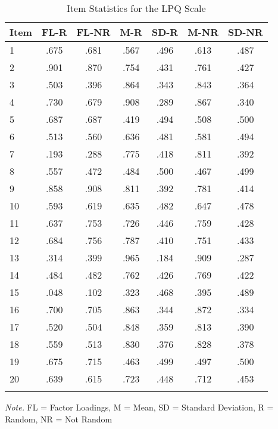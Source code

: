 \documentclass[english,man, mask]{apa6}
\theoremstyle{definition}
\theoremstyle{definition}
\theoremstyle{definition}
\theoremstyle{remark}
\begin{document}
\begin{table}[tbp]
\begin{center}
\begin{threeparttable}
\caption{\label{tab:Ltable}Item Statistics for the LPQ Scale}
\begin{tabular}{lcccccc}
\toprule
Item & \multicolumn{1}{c}{FL-R} & \multicolumn{1}{c}{FL-NR} & \multicolumn{1}{c}{M-R} & \multicolumn{1}{c}{SD-R} & \multicolumn{1}{c}{M-NR} & \multicolumn{1}{c}{SD-NR}\\
\midrule
1 & .675 & .681 & .567 & .496 & .613 & .487\\
2 & .901 & .870 & .754 & .431 & .761 & .427\\
3 & .503 & .396 & .864 & .343 & .843 & .364\\
4 & .730 & .679 & .908 & .289 & .867 & .340\\
5 & .687 & .687 & .419 & .494 & .508 & .500\\
6 & .513 & .560 & .636 & .481 & .581 & .494\\
7 & .193 & .288 & .775 & .418 & .811 & .392\\
8 & .557 & .472 & .484 & .500 & .467 & .499\\
9 & .858 & .908 & .811 & .392 & .781 & .414\\
10 & .593 & .619 & .635 & .482 & .647 & .478\\
11 & .637 & .753 & .726 & .446 & .759 & .428\\
12 & .684 & .756 & .787 & .410 & .751 & .433\\
13 & .314 & .399 & .965 & .184 & .909 & .287\\
14 & .484 & .482 & .762 & .426 & .769 & .422\\
15 & .048 & .102 & .323 & .468 & .395 & .489\\
16 & .700 & .705 & .863 & .344 & .872 & .334\\
17 & .520 & .504 & .848 & .359 & .813 & .390\\
18 & .559 & .513 & .830 & .376 & .828 & .378\\
19 & .675 & .715 & .463 & .499 & .497 & .500\\
20 & .639 & .615 & .723 & .448 & .712 & .453\\
\bottomrule
\addlinespace
\end{tabular}
\begin{tablenotes}[para]
\textit{Note.} FL = Factor Loadings, M = Mean, SD = Standard Deviation, R = Random, NR = Not Random
\end{tablenotes}
\end{threeparttable}
\end{center}
\end{table}
\end{document}
